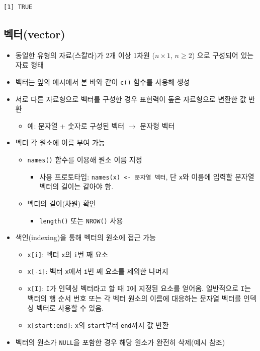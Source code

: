 \documentclass[11pt,a4paper]{book}
\providecommand{\tightlist}{%
  \setlength{\itemsep}{0pt}\setlength{\parskip}{0pt}}
\theoremstyle{definition}
\theoremstyle{definition}
\theoremstyle{definition}
\theoremstyle{remark}
\begin{document}
\begin{verbatim}
[1] TRUE
\end{verbatim}

\normalsize

\subsection{벡터(vector)}\label{vector}

\begin{itemize}
\tightlist
\item
  동일한 유형의 자료(스칼라)가 2개 이상 1차원 (\(n \times 1\),
  \(n \geq 2\)) 으로 구성되어 있는 자료 형태
\item
  벡터는 앞의 예시에서 본 바와 같이 \texttt{c()} 함수를 사용해 생성
\item
  서로 다른 자료형으로 벡터를 구성한 경우 표현력이 돞은 자료형으로
  변환한 값 반환

  \begin{itemize}
  \tightlist
  \item
    예: 문자열 + 숫자로 구성된 벡터 \(\rightarrow\) 문자형 벡터
  \end{itemize}
\item
  벡터 각 원소에 이름 부여 가능

  \begin{itemize}
  \tightlist
  \item
    \texttt{names()} 함수를 이용해 원소 이름 지정

    \begin{itemize}
    \tightlist
    \item
      사용 프로토타입: \texttt{names(x)\ \textless{}-\ 문자열\ 벡터}, 단
      \texttt{x}와 이름에 입력할 문자열 벡터의 길이는 같아야 함.
    \end{itemize}
  \item
    벡터의 길이(차원) 확인

    \begin{itemize}
    \tightlist
    \item
      \texttt{length()} 또는 \texttt{NROW()} 사용
    \end{itemize}
  \end{itemize}
\item
  색인(indexing)을 통해 벡터의 원소에 접근 가능

  \begin{itemize}
  \tightlist
  \item
    \texttt{x{[}i{]}}: 벡터 \texttt{x}의 \texttt{i}번 째 요소
  \item
    \texttt{x{[}-i{]}}: 벡터 \texttt{x}에서 \texttt{i}번 째 요소를
    제외한 나머지
  \item
    \texttt{x{[}I{]}}: \texttt{I}가 인덱싱 벡터라고 할 때 \texttt{I}에
    지정된 요소를 얻어옴. 일반적으로 \texttt{I}는 백터의 행 순서 번호
    또는 각 벡터 원소의 이름에 대응하는 문자열 벡터를 인덱싱 벡터로
    사용할 수 있음.
  \item
    \texttt{x{[}start:end{]}}: \texttt{x}의 \texttt{start}부터
    \texttt{end}까지 값 반환
  \end{itemize}
\item
  벡터의 원소가 \texttt{NULL}을 포함한 경우 해당 원소가 완전히 삭제(예시
  참조)
\end{itemize}
\end{document}
